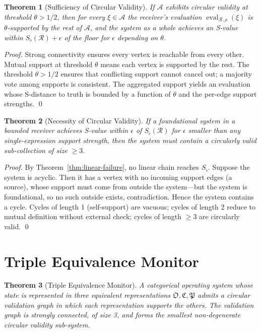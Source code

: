 \documentclass[twocolumn,a4paper]{article}
\newtheorem{theorem}{Theorem}[section]
\DeclareMathOperator{\eval}{eval}
\newcommand{\receiver}{\mathcal{R}}
\newcommand{\Sfloor}{S_{\flat}}
\newcommand{\OOsc}{\mathfrak{O}}
\newcommand{\CCat}{\mathfrak{C}}
\newcommand{\PPart}{\mathfrak{P}}
\begin{document}
\begin{theorem}[Sufficiency of Circular Validity]
\label{thm:circular-sufficiency}
If $\mathcal{A}$ exhibits circular validity at threshold $\theta>1/2$, then for every $\xi\in\mathcal{A}$ the receiver's evaluation $\eval_{\receiver,\rho}(\xi)$ is $\theta$-supported by the rest of $\mathcal{A}$, and the system as a whole achieves an S-value within $\Sfloor(\receiver)+\epsilon$ of the floor for $\epsilon$ depending on $\theta$.
\end{theorem}

\begin{proof}
Strong connectivity ensures every vertex is reachable from every other. Mutual support at threshold $\theta$ means each vertex is supported by the rest. The threshold $\theta>1/2$ ensures that conflicting support cannot cancel out; a majority vote among supports is consistent. The aggregated support yields an evaluation whose S-distance to truth is bounded by a function of $\theta$ and the per-edge support strengths. \qed
\end{proof}

\begin{theorem}[Necessity of Circular Validity]
\label{thm:circular-necessity}
If a foundational system in a bounded receiver achieves S-value within $\epsilon$ of $\Sfloor(\receiver)$ for $\epsilon$ smaller than any single-expression support strength, then the system must contain a circularly valid sub-collection of size $\geq 3$.
\end{theorem}

\begin{proof}
By Theorem~\ref{thm:linear-failure}, no linear chain reaches $\Sfloor$. Suppose the system is acyclic. Then it has a vertex with no incoming support edges (a source), whose support must come from outside the system---but the system is foundational, so no such outside exists, contradiction. Hence the system contains a cycle. Cycles of length 1 (self-support) are vacuous; cycles of length 2 reduce to mutual definition without external check; cycles of length $\geq 3$ are circularly valid. \qed
\end{proof}

\section{Triple Equivalence Monitor}
\label{sec:tem}

\begin{theorem}[Triple Equivalence Monitor]
\label{thm:tem}
A categorical operating system whose state is represented in three equivalent representations $\OOsc,\CCat,\PPart$ admits a circular validation graph in which each representation supports the others. The validation graph is strongly connected, of size 3, and forms the smallest non-degenerate circular validity sub-system.
\end{theorem}
\end{document}
